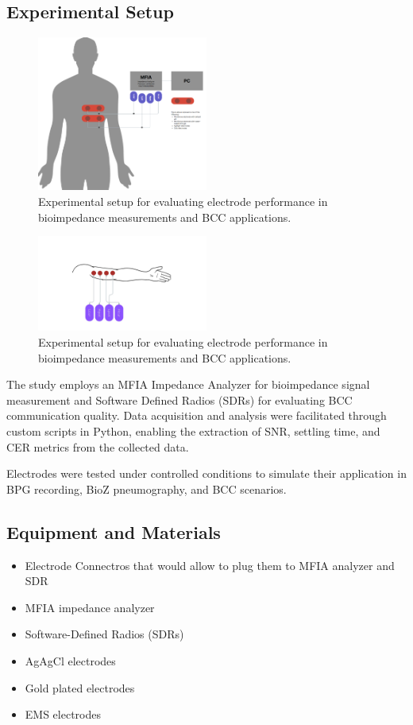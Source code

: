 \documentclass[conference]{IEEEtran}
\begin{document}
\subsection{Experimental Setup}
\begin{figure}[!ht]
    \centering
    \includegraphics[width=0.5\textwidth]{figures/experimentSetup.png}
    \caption{Experimental setup for evaluating electrode performance in bioimpedance measurements and BCC applications.}
    \label{fig:experimental_setup}
\end{figure}

\begin{figure}
    \centering
    \includegraphics[width=0.5\textwidth]{figures/experimentSetup_upper_arm.jpeg}
    \caption{Experimental setup for evaluating electrode performance in bioimpedance measurements and BCC applications.}
    \label{fig:experimental_setup_upper_arm}
\end{figure}

The study employs an MFIA Impedance Analyzer for bioimpedance signal measurement and Software Defined Radios (SDRs) for evaluating BCC communication quality. Data acquisition and analysis were facilitated through custom scripts in Python, enabling the extraction of SNR, settling time, and CER metrics from the collected data.

Electrodes were tested under controlled conditions to simulate their application in BPG recording, BioZ pneumography, and BCC scenarios.

\subsection{Equipment and Materials}
\begin{itemize}
    \item Electrode Connectros that would allow to plug them to MFIA analyzer and SDR
    \item MFIA impedance analyzer
    \item Software-Defined Radios (SDRs)
    \item AgAgCl electrodes
    \item Gold plated electrodes
    \item EMS electrodes
\end{itemize}
\end{document}
